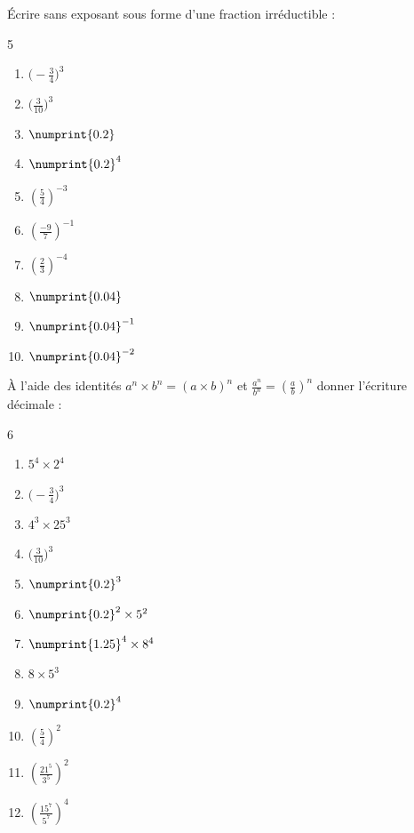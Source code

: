 \begin{exercise}[\cancel{\faCalculator}] Écrire sans exposant sous forme d'une fraction irréductible :
	\begin{multicols}{5} 
		\begin{enumerate}[label=\textbullet\rule{0pt}{1.8em},leftmargin=*] 
			\item $\big(-\tfrac{3}{4}\big)^3$
			\item $\big(\tfrac{3}{10}\big)^3$ 
			\item $\numprint{0.2}$ 
			\item $\numprint{0.2}^4$     
			\item $\left(\tfrac{5}{4}\right)^{-3}$ 
			\item $\left(\tfrac{-9}{7}\right)^{-1}$   
			\item   $\left(\tfrac{2}{3}\right)^{-4}$
			\item $\numprint{0.04}$
			\item $\numprint{0.04}^{-1}$
			\item $\numprint{0.04}^{-2}$
		\end{enumerate}
	\end{multicols} 
\end{exercise}
\begin{exercise}[\cancel{\faCalculator}] À l'aide des identités $a^n\times b^n=(a\times b)^n$ et $\tfrac{a^n}{b^n}=\left(\tfrac{a}{b}\right)^n$ donner l'écriture décimale :
	\begin{multicols}{6} 
		\begin{enumerate}[label=\textbullet\rule{0pt}{1.8em},leftmargin=*] 
			\item $5^4\times 2^4$ 
			\item $\big(-\tfrac{3}{4}\big)^3$
			\item $4^3\times 25^3$  
			\item $\big(\tfrac{3}{10}\big)^3$ 
			\item $\numprint{0.2}^3$  
			\item $\numprint{0.2}^2\times 5^2$ 
			\item $\numprint{1.25}^4\times 8^4$  
			\item $8\times 5^3$ 
			\item $\numprint{0.2}^4$   
			\item $\left(\tfrac{5}{4}\right)^{2}$ 
			\item $\left(\tfrac{21^5}{3^5}\right)^2$
			\item $\left(\tfrac{15^7}{5^7}\right)^4$
		\end{enumerate}
	\end{multicols} 
\end{exercise}
